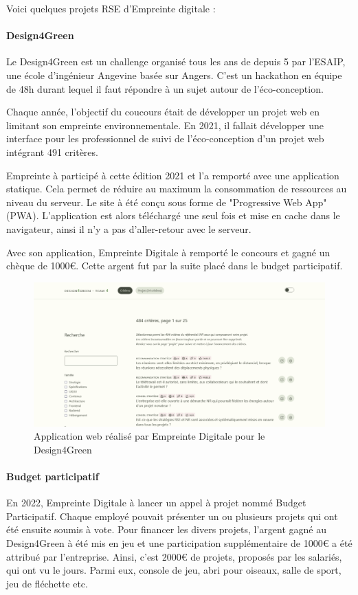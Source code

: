 \documentclass[12pt]{article}
\begin{document}
Voici quelques projets RSE d'Empreinte digitale :
\paragraph{Design4Green}
Le Design4Green est un challenge organisé tous les ans de depuis 5 par l'ESAIP, une école d'ingénieur Angevine basée sur Angers. 
C'est un hackathon en équipe de 48h durant lequel il faut répondre à un sujet autour de l'éco-conception.

Chaque année, l'objectif du coucours était de développer un projet web en limitant son empreinte environnementale. 
En 2021, il fallait développer une interface pour les professionnel de suivi de l'éco-conception d'un projet web intégrant 491 critères.

Empreinte à participé à cette édition 2021 et l'a remporté avec une application statique. 
Cela permet de réduire au maximum la consommation de ressources au niveau du serveur. 
Le site à été conçu sous forme de "Progressive Web App" (PWA). 
L'application est alors téléchargé une seul fois et mise en cache dans le navigateur, ainsi il n'y a pas d'aller-retour avec le serveur.

Avec son application, Empreinte Digitale à remporté le concours et gagné un chèque de 1000€. 
Cette argent fut par la suite placé dans le budget participatif.

\begin{figure}[!ht]
    \centering
    \includegraphics[width=\textwidth]{src/design4fgreen.png}
    \caption{Application web réalisé par Empreinte Digitale pour le Design4Green}
    \label{fig:design4greenl}
\end{figure}

\paragraph{Budget participatif}
En 2022, Empreinte Digitale à lancer un appel à projet nommé Budget Participatif. 
Chaque employé pouvait présenter un ou plusieurs projets qui ont été ensuite soumis à vote. 
Pour financer les divers projets, l'argent gagné au Design4Green à été mis en jeu et une participation supplémentaire de 1000€ a été attribué par l'entreprise. 
Ainsi, c'est 2000€ de projets, proposés par les salariés, qui ont vu le jours. 
Parmi eux, console de jeu, abri pour oiseaux, salle de sport, jeu de fléchette etc.
\end{document}
